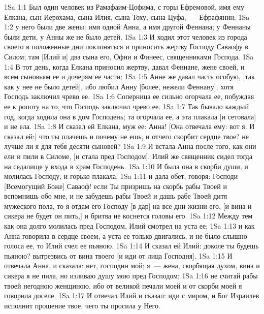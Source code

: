 \vs 1Sa 1:1 Был один человек из Рамафаим-Цофима, с горы Ефремовой, имя ему Елкана, сын Иерохама, сына Илия, сына Тоху, сына Цуфа,~--- Ефрафянин;
\vs 1Sa 1:2 у него были две жены: имя одной Анна, а имя другой Феннана; у Феннаны были дети, у Анны же не было детей.
\vs 1Sa 1:3 И ходил этот человек из города своего в положенные дни поклоняться и приносить жертву Господу Саваофу в Силом; там  [Илий и] два сына его, Офни и Финеес, священниками Господа.
\rsbpar\vs 1Sa 1:4 В тот день, когда Елкана приносил жертву, давал Феннане, жене своей, и всем сыновьям ее и дочерям ее части;
\vs 1Sa 1:5 Анне же давал часть особую, [так как у нее не было детей], ибо любил Анну [более, нежели Феннану], хотя Господь заключил чрево ее.
\vs 1Sa 1:6 Соперница ее сильно огорчала ее, побуждая ее к ропоту на то, что Господь заключил чрево ее.
\vs 1Sa 1:7 Так бывало каждый год, когда ходила она в дом Господень; та огорчала ее, а эта плакала [и сетовала] и не ела.
\vs 1Sa 1:8 И сказал ей Елкана, муж ее: Анна! [Она отвечала ему: вот я. И сказал ей:] что ты плачешь и почему не ешь, и отчего скорбит сердце твое? не лучше ли я для тебя десяти сыновей?
\vs 1Sa 1:9 И встала Анна после того, как они ели и пили в Силоме, [и стала пред Господом]. Илий же священник сидел тогда на седалище у входа в храм Господень.
\vs 1Sa 1:10 И была она в скорби души, и молилась Господу, и горько плакала,
\vs 1Sa 1:11 и дала обет, говоря: Господи [Всемогущий Боже] Саваоф! если Ты призришь на скорбь рабы Твоей и вспомнишь обо мне, и не забудешь рабы Твоей и дашь рабе Твоей дитя мужеского пола, то я отдам его Господу [в дар] на все дни жизни его, [и вина и сикера не будет он пить,] и бритва не коснется головы его.
\vs 1Sa 1:12 Между тем как она долго молилась пред Господом, Илий смотрел на уста ее;
\vs 1Sa 1:13 и как Анна говорила в сердце своем, а уста ее только двигались, и не было слышно голоса ее, то Илий счел ее пьяною.
\vs 1Sa 1:14 И сказал ей Илий: доколе ты будешь пьяною? вытрезвись от вина твоего [и иди от лица Господня].
\vs 1Sa 1:15 И отвечала Анна, и сказала: нет, господин мой; я~--- жена, скорбящая духом, вина и сикера я не пила, но изливаю душу мою пред Господом;
\vs 1Sa 1:16 не считай рабы твоей негодною женщиною, ибо от великой печали моей и от скорби моей я говорила доселе.
\vs 1Sa 1:17 И отвечал Илий и сказал: иди с миром, и Бог Израилев исполнит прошение твое, чего ты просила у Него.
